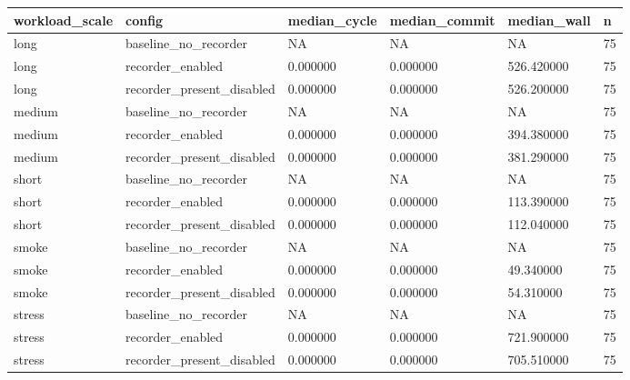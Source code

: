 \begin{tabular}{llllll}
 \hline
workload\_scale & config & median\_cycle & median\_commit & median\_wall & n \\
 \hline
long & baseline\_no\_recorder & NA & NA & NA & 75 \\
long & recorder\_enabled & 0.000000 & 0.000000 & 526.420000 & 75 \\
long & recorder\_present\_disabled & 0.000000 & 0.000000 & 526.200000 & 75 \\
medium & baseline\_no\_recorder & NA & NA & NA & 75 \\
medium & recorder\_enabled & 0.000000 & 0.000000 & 394.380000 & 75 \\
medium & recorder\_present\_disabled & 0.000000 & 0.000000 & 381.290000 & 75 \\
short & baseline\_no\_recorder & NA & NA & NA & 75 \\
short & recorder\_enabled & 0.000000 & 0.000000 & 113.390000 & 75 \\
short & recorder\_present\_disabled & 0.000000 & 0.000000 & 112.040000 & 75 \\
smoke & baseline\_no\_recorder & NA & NA & NA & 75 \\
smoke & recorder\_enabled & 0.000000 & 0.000000 & 49.340000 & 75 \\
smoke & recorder\_present\_disabled & 0.000000 & 0.000000 & 54.310000 & 75 \\
stress & baseline\_no\_recorder & NA & NA & NA & 75 \\
stress & recorder\_enabled & 0.000000 & 0.000000 & 721.900000 & 75 \\
stress & recorder\_present\_disabled & 0.000000 & 0.000000 & 705.510000 & 75 \\
 \hline
\end{tabular}
